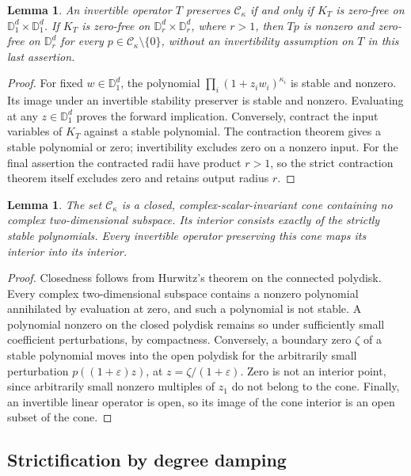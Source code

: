 \documentclass[reqno]{amsart}
\newtheorem{lemma}[theorem]{Lemma}
\theoremstyle{definition}
\theoremstyle{remark}
\newcommand{\D}{\mathbb D}
\begin{document}
\begin{lemma}\label{spec:kernel-criterion}
An invertible operator \(T\) preserves \(\mathcal C_\kappa\) if and
only if \(K_T\) is zero-free on \(\D_1^d\times\D_1^d\).
If \(K_T\) is zero-free on \(\D_r^d\times\D_r^d\), where \(r>1\),
then \(Tp\) is nonzero and zero-free on \(\D_r^d\) for every
\(p\in\mathcal C_\kappa\setminus\{0\}\), without an invertibility
assumption on \(T\) in this last assertion.
\end{lemma}
\begin{proof}
For fixed \(w\in\D_1^d\), the polynomial
\(\prod_i(1+z_iw_i)^{\kappa_i}\) is stable and nonzero.  Its image
under an invertible stability preserver is stable and nonzero.  Evaluating
at any \(z\in\D_1^d\) proves the forward implication.  Conversely,
contract the input variables of \(K_T\) against a stable polynomial.
The contraction theorem gives a stable polynomial or zero; invertibility
excludes zero on a nonzero input.  For the final assertion the contracted
radii have product \(r>1\), so the strict contraction theorem itself
excludes zero and retains output radius \(r\).
\end{proof}

\begin{lemma}\label{spec:cone-interior}
The set \(\mathcal C_\kappa\) is a closed, complex-scalar-invariant
cone containing no complex two-dimensional subspace.  Its interior consists
exactly of the strictly stable polynomials.  Every invertible operator
preserving this cone maps its interior into its interior.
\end{lemma}
\begin{proof}
Closedness follows from Hurwitz's theorem on the connected polydisk.
Every complex two-dimensional subspace contains a nonzero polynomial
annihilated by evaluation at zero, and such a polynomial is not stable.
A polynomial nonzero on the closed polydisk remains so under sufficiently
small coefficient perturbations, by compactness.  Conversely, a boundary
zero \(\zeta\) of a stable polynomial moves into the open polydisk for
the arbitrarily small perturbation \(p((1+\varepsilon)z)\), at
\(z=\zeta/(1+\varepsilon)\).  Zero is not an interior point, since
arbitrarily small nonzero multiples of \(z_1\) do not belong to the
cone.  Finally, an invertible linear operator is open, so its image of
the cone interior is an open subset of the cone.
\end{proof}

\subsection{Strictification by degree damping}
\end{document}
